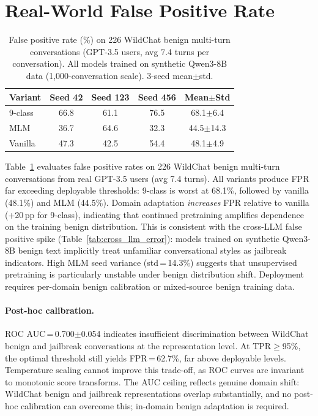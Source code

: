 \section{Real-World False Positive Rate}
\label{app:wildchat_fpr}

\begin{table}[ht]
\centering
\footnotesize
\caption{False positive rate (\%) on 226 WildChat benign multi-turn conversations (GPT-3.5 users, avg 7.4 turns per conversation). All models trained on synthetic Qwen3-8B data (1{,}000-conversation scale). 3-seed mean$\pm$std.}
\label{tab:wildchat_fpr}
\begin{tabular}{@{}lcccc@{}}
\toprule
\textbf{Variant} & Seed 42 & Seed 123 & Seed 456 & Mean$\pm$Std \\
\midrule
9-class & 66.8 & 61.1 & 76.5 & 68.1$\pm$6.4 \\
MLM & 36.7 & 64.6 & 32.3 & 44.5$\pm$14.3 \\
Vanilla & 47.3 & 42.5 & 54.4 & 48.1$\pm$4.9 \\
\bottomrule
\end{tabular}
\end{table}

Table~\ref{tab:wildchat_fpr} evaluates false positive rates on 226 WildChat benign multi-turn conversations from real GPT-3.5 users (avg 7.4 turns). All variants produce FPR far exceeding deployable thresholds: 9-class is worst at 68.1\%, followed by vanilla (48.1\%) and MLM (44.5\%). Domain adaptation \emph{increases} FPR relative to vanilla (+20\,pp for 9-class), indicating that continued pretraining amplifies dependence on the training benign distribution. This is consistent with the cross-LLM false positive spike (Table~\ref{tab:cross_llm_error}): models trained on synthetic Qwen3-8B benign text implicitly treat unfamiliar conversational styles as jailbreak indicators. High MLM seed variance (std\,=\,14.3\%) suggests that unsupervised pretraining is particularly unstable under benign distribution shift. Deployment requires per-domain benign calibration or mixed-source benign training data.

\paragraph{Post-hoc calibration.}
ROC AUC\,=\,0.700$\pm$0.054 indicates insufficient discrimination between WildChat benign and jailbreak conversations at the representation level. At TPR$\geq$95\%, the optimal threshold still yields FPR\,=\,62.7\%, far above deployable levels. Temperature scaling cannot improve this trade-off, as ROC curves are invariant to monotonic score transforms. The AUC ceiling reflects genuine domain shift: WildChat benign and jailbreak representations overlap substantially, and no post-hoc calibration can overcome this; in-domain benign adaptation is required.

